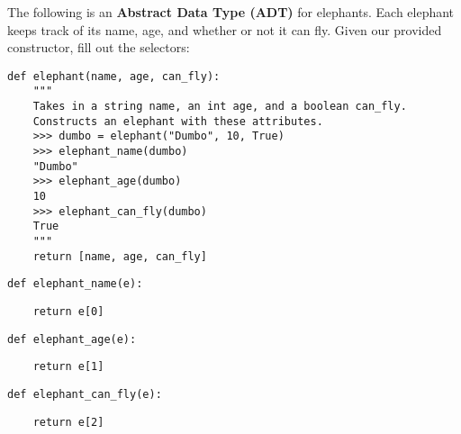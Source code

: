\begin{blocksection}
\question The following is an \textbf{Abstract Data Type (ADT)} for elephants.
Each elephant keeps track of its name, age, and whether or not it can fly. Given
our provided constructor, fill out the selectors:

\begin{lstlisting}
def elephant(name, age, can_fly):
    """
    Takes in a string name, an int age, and a boolean can_fly.
    Constructs an elephant with these attributes.
    >>> dumbo = elephant("Dumbo", 10, True)
    >>> elephant_name(dumbo)
    "Dumbo"
    >>> elephant_age(dumbo)
    10
    >>> elephant_can_fly(dumbo)
    True
    """
    return [name, age, can_fly]

\end{lstlisting}

\end{blocksection}
\begin{blocksection}

\begin{lstlisting}
def elephant_name(e):
\end{lstlisting}
\begin{solution}[1in]
\begin{lstlisting}
    return e[0]
\end{lstlisting}
\end{solution}
\end{blocksection}
\begin{blocksection}

\begin{lstlisting}
def elephant_age(e):
\end{lstlisting}
\begin{solution}[1in]
\begin{lstlisting}
    return e[1]
\end{lstlisting}
\end{solution}
\end{blocksection}
\begin{blocksection}

\begin{lstlisting}
def elephant_can_fly(e):
\end{lstlisting}
\begin{solution}[1in]
\begin{lstlisting}
    return e[2]
\end{lstlisting}
\end{solution}
\end{blocksection}

